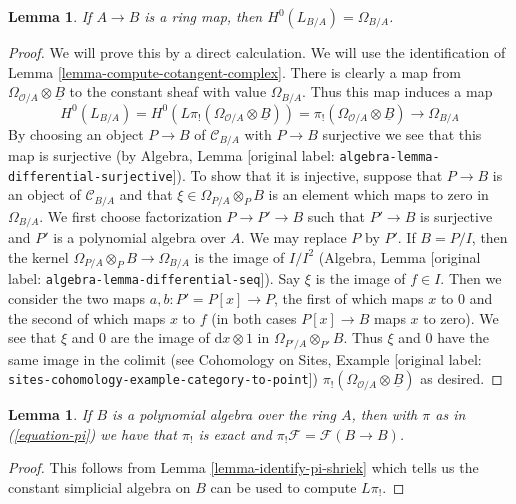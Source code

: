 \documentclass[10pt,a4paper]{article}
\theoremstyle{plain}
\newtheorem{lemma}[subsection]{Lemma}
\theoremstyle{definition}
\theoremstyle{remark}
\numberwithin{equation}{subsection}
\begin{document}
\begin{lemma}
\label{lemma-identify-H0}
If $A \to B$ is a ring map, then $H^0(L_{B/A}) = \Omega_{B/A}$.
\end{lemma}

\begin{proof}
We will prove this by a direct calculation.
We will use the identification of Lemma \ref{lemma-compute-cotangent-complex}.
There is clearly a map from $\Omega_{\mathcal{O}/A} \otimes \underline{B}$
to the constant sheaf with value $\Omega_{B/A}$. Thus this map induces
a map
$$
H^0(L_{B/A}) = H^0(L\pi_!(\Omega_{\mathcal{O}/A} \otimes \underline{B}))
= \pi_!(\Omega_{\mathcal{O}/A} \otimes \underline{B}) \to \Omega_{B/A}
$$
By choosing an object $P \to B$ of $\mathcal{C}_{B/A}$ with $P \to B$
surjective we see that this map is surjective (by
Algebra, Lemma \textnormal{[original label: \nolinkurl{algebra-lemma-differential-surjective}]}).
To show that it is injective, suppose that $P \to B$ is an object
of $\mathcal{C}_{B/A}$ and that $\xi \in \Omega_{P/A} \otimes_P B$
is an element which maps to zero in $\Omega_{B/A}$.
We first choose factorization $P \to P' \to B$ such that $P' \to B$
is surjective and $P'$ is a polynomial algebra over $A$.
We may replace $P$ by $P'$. If $B = P/I$, then the kernel
$\Omega_{P/A} \otimes_P B \to \Omega_{B/A}$ is the image of
$I/I^2$ (Algebra, Lemma \textnormal{[original label: \nolinkurl{algebra-lemma-differential-seq}]}).
Say $\xi$ is the image of $f \in I$.
Then we consider the two maps $a, b : P' = P[x] \to P$, the first of which
maps $x$ to $0$ and the second of which maps $x$ to $f$ (in both
cases $P[x] \to B$ maps $x$ to zero). We see that $\xi$ and $0$
are the image of $\text{d}x \otimes 1$ in $\Omega_{P'/A} \otimes_{P'} B$.
Thus $\xi$ and $0$ have the same image in the colimit (see
Cohomology on Sites, Example \textnormal{[original label: \nolinkurl{sites-cohomology-example-category-to-point}]})
$\pi_!(\Omega_{\mathcal{O}/A} \otimes \underline{B})$ as desired.
\end{proof}

\begin{lemma}
\label{lemma-pi-lower-shriek-polynomial-algebra}
If $B$ is a polynomial algebra over the ring $A$, then
with $\pi$ as in (\ref{equation-pi}) we have that
$\pi_!$ is exact and $\pi_!\mathcal{F} = \mathcal{F}(B \to B)$.
\end{lemma}

\begin{proof}
This follows from Lemma \ref{lemma-identify-pi-shriek} which tells us
the constant simplicial algebra on $B$ can be used to compute $L\pi_!$.
\end{proof}
\end{document}
